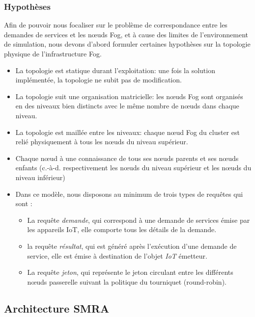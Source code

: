 \subsubsection{Hypothèses}


Afin de pouvoir nous focaliser sur le problème de correspondance entre les demandes de services et les nœuds Fog, et à cause des limites de l'environnement de simulation, nous devons d'abord formuler certaines hypothèses sur la topologie physique de l'infrastructure Fog.\\


\begin{itemize}
    \item La topologie est statique durant l'exploitation: une fois la solution implémentée, la topologie ne subit pas de modification.
    \item La topologie suit une organisation matricielle: les nœuds Fog sont organisés en des niveaux bien distincts avec le même nombre de nœuds dans chaque niveau.
    \item La topologie est maillée entre les niveaux: chaque nœud Fog du cluster est relié physiquement à tous les nœuds du niveau supérieur.
    \item Chaque nœud à une connaissance de tous ses nœuds parents et ses nœuds enfants (c.-à-d. respectivement les nœuds du niveau supérieur et les nœuds du niveau inférieur)
    \item Dans ce modèle, nous disposons au minimum de trois types de requêtes qui sont : \\
          \begin{itemize}
             \item La requête \emph{demande}, qui correspond à une demande de services émise par les appareils IoT, elle comporte tous les détails de la demande.
             \item la requête \emph{résultat}, qui est généré après l'exécution d'une demande de service, elle est émise à destination de l'objet \emph{IoT} émetteur.
             \item La requête \emph{jeton}, qui représente le jeton circulant entre les différents nœuds passerelle suivant la politique du tourniquet (round-robin).
          \end{itemize}
\end{itemize}



\subsection{Architecture SMRA}


